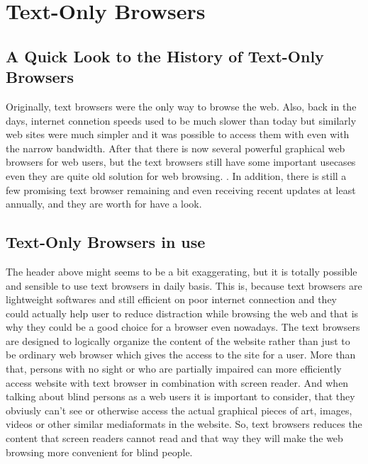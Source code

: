 %
%
% 
% 


\chapter{Text-Only Browsers}

\section[History of Text Browsers]{A Quick Look to the History of Text-Only Browsers}
\label{tb-history}
Originally, text browsers were the only way to browse the web. Also, back in the days, internet connetion speeds used to be much slower than today but similarly web sites were much simpler and it was possible to access them with even with the narrow bandwidth. After that there is now several powerful graphical web browsers for web users, but the text browsers still have some important usecases even they are quite old solution for web browsing. \parencite{best-text-browsers}. In addition, there is still a few promising text browser remaining and even receiving recent updates at least annually, and they are worth for have a look.

\section{Text-Only Browsers in use}
\label{tb-known}
The header above might seems to be a bit exaggerating, but it is totally possible and sensible to use text browsers in daily basis. This is, because text browsers are lightweight softwares and still efficient on poor internet connection and they could actually help user to reduce distraction while browsing the web and that is why they could be a good choice for a browser even nowadays. The text browsers are designed to logically organize the content of the website rather than just to be ordinary web browser which gives the access to the site for a user. More than that, persons with no sight or who are partially impaired can more efficiently access website with text browser in combination with screen reader. And when talking about blind persons as a web users it is important to consider, that they obviusly can't see or otherwise access the actual graphical pieces of art, images, videos or other similar mediaformats in the website. \parencite[Chapter 2]{webbie} So, text browsers reduces the content that screen readers cannot read and that way they will make the web browsing more convenient for blind people.

